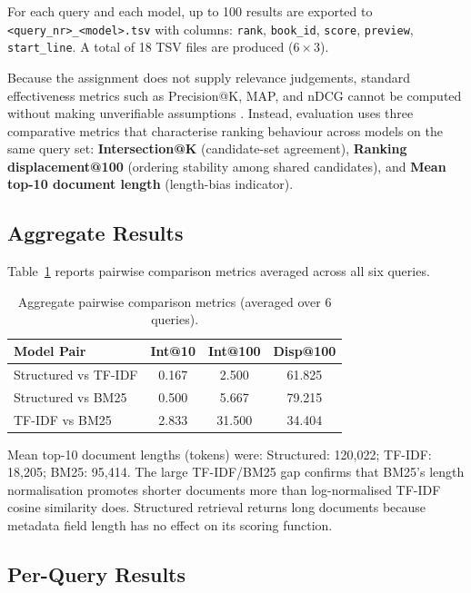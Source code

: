 \documentclass[sigconf]{acmart}
\begin{document}
For each query and each model, up to 100 results are exported to \texttt{<query\_nr>\_<model>.tsv} with columns: \texttt{rank}, \texttt{book\_id}, \texttt{score}, \texttt{preview}, \texttt{start\_line}. A total of 18 TSV files are produced ($6 \times 3$).

Because the assignment does not supply relevance judgements, standard effectiveness metrics such as Precision@K, MAP, and nDCG cannot be computed without making unverifiable assumptions \cite{manning2008}. Instead, evaluation uses three comparative metrics that characterise ranking behaviour across models on the same query set: \textbf{Intersection@K} (candidate-set agreement), \textbf{Ranking displacement@100} (ordering stability among shared candidates), and \textbf{Mean top-10 document length} (length-bias indicator).

\subsection{Aggregate Results}

Table~\ref{tab:agg} reports pairwise comparison metrics averaged across all six queries.

\begin{table}[t]
\caption{Aggregate pairwise comparison metrics (averaged over 6 queries).}
\label{tab:agg}
\centering
\begin{tabular}{lccc}
\toprule
Model Pair & Int@10 & Int@100 & Disp@100 \\
\midrule
Structured vs TF-IDF & 0.167 & 2.500  & 61.825 \\
Structured vs BM25   & 0.500 & 5.667  & 79.215 \\
TF-IDF vs BM25       & 2.833 & 31.500 & 34.404 \\
\bottomrule
\end{tabular}
\end{table}

Mean top-10 document lengths (tokens) were: Structured: 120,022; TF-IDF: 18,205; BM25: 95,414. The large TF-IDF/BM25 gap confirms that BM25's length normalisation promotes shorter documents more than log-normalised TF-IDF cosine similarity does. Structured retrieval returns long documents because metadata field length has no effect on its scoring function.

\subsection{Per-Query Results}
\end{document}

